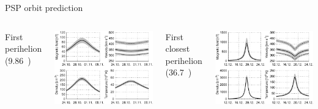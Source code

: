 \begin{frame}[c]{PSP orbit prediction}{}
	\begin{columns}[c]
		
		\centering
		First perihelion (9.86~\Rs)\\\ 
		
		\includegraphics[width=\textwidth]{../figures_paper/SPP_perihelia_prediction_f_plot.pdf}

	
		\centering
		First closest perihelion (36.7~\Rs)\\\ 
		
		\includegraphics[width=\textwidth]{../figures_paper/SPP_perihelia_prediction_nearest_f_plot.pdf}

	\end{columns}
\end{frame}
